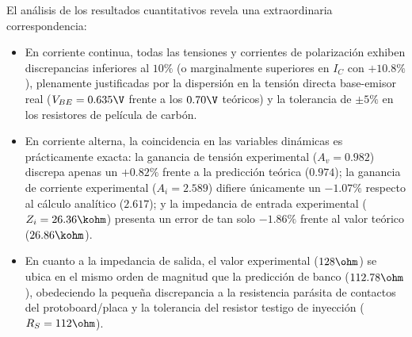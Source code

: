El análisis de los resultados cuantitativos revela una extraordinaria correspondencia:
\begin{itemize}
  \item En corriente continua, todas las tensiones y corrientes de polarización exhiben discrepancias inferiores al
    $10\%$ (o marginalmente superiores en $I_C$ con $+10.8\%$), plenamente justificadas por la dispersión en la tensión
    directa base-emisor real ($V_{BE} = 0.635\V$ frente a los $0.70\V$ teóricos) y la tolerancia de $\pm 5\%$ en los
    resistores de película de carbón.
  \item En corriente alterna, la coincidencia en las variables dinámicas es prácticamente exacta:
    la ganancia de tensión experimental ($A_v = 0.982$) discrepa apenas un $+0.82\%$ frente a la predicción teórica ($0.974$);
    la ganancia de corriente experimental ($A_i = 2.589$) difiere únicamente un $-1.07\%$ respecto al cálculo analítico ($2.617$);
    y la impedancia de entrada experimental ($Z_i = 26.36\kohm$) presenta un error de tan solo $-1.86\%$ frente al valor
    teórico ($26.86\kohm$).
  \item En cuanto a la impedancia de salida, el valor experimental ($128\ohm$) se ubica en el mismo orden de magnitud
    que la predicción de banco ($112.78\ohm$), obedeciendo la pequeña discrepancia a la resistencia parásita de contactos
    del protoboard/placa y la tolerancia del resistor testigo de inyección ($R_S = 112\ohm$).
\end{itemize}
